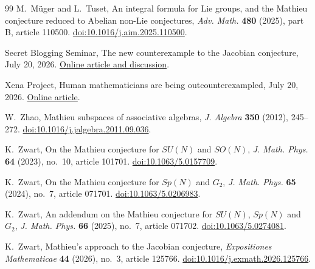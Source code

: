 \documentclass[11pt]{article}
\numberwithin{equation}{section}
\begin{document}
\begin{thebibliography}{99}
M.~M\"uger and L.~Tuset,
An integral formula for Lie groups, and the Mathieu conjecture reduced to
Abelian non-Lie conjectures,
\emph{Adv. Math.} \textbf{480} (2025), part B, article 110500.
\href{https://doi.org/10.1016/j.aim.2025.110500}{doi:10.1016/j.aim.2025.110500}.

Secret Blogging Seminar,
The new counterexample to the Jacobian conjecture,
July 20, 2026.
\href{https://sbseminar.wordpress.com/2026/07/20/the-new-counterexample-to-the-jacobian-conjecture/}{Online article and discussion}.

Xena Project,
Human mathematicians are being outcounterexampled,
July 20, 2026.
\href{https://xenaproject.wordpress.com/2026/07/20/human-mathematicians-are-being-outcounterexampled/}{Online article}.

W.~Zhao,
Mathieu subspaces of associative algebras,
\emph{J. Algebra} \textbf{350} (2012), 245--272.
\href{https://doi.org/10.1016/j.jalgebra.2011.09.036}{doi:10.1016/j.jalgebra.2011.09.036}.

K.~Zwart,
On the Mathieu conjecture for $SU(N)$ and $SO(N)$,
\emph{J. Math. Phys.} \textbf{64} (2023), no.~10, article 101701.
\href{https://doi.org/10.1063/5.0157709}{doi:10.1063/5.0157709}.

K.~Zwart,
On the Mathieu conjecture for $Sp(N)$ and $G_2$,
\emph{J. Math. Phys.} \textbf{65} (2024), no.~7, article 071701.
\href{https://doi.org/10.1063/5.0206983}{doi:10.1063/5.0206983}.

K.~Zwart,
An addendum on the Mathieu conjecture for $SU(N)$, $Sp(N)$ and $G_2$,
\emph{J. Math. Phys.} \textbf{66} (2025), no.~7, article 071702.
\href{https://doi.org/10.1063/5.0274081}{doi:10.1063/5.0274081}.

K.~Zwart,
Mathieu's approach to the Jacobian conjecture,
\emph{Expositiones Mathematicae} \textbf{44} (2026), no.~3,
article 125766.
\href{https://doi.org/10.1016/j.exmath.2026.125766}{doi:10.1016/j.exmath.2026.125766}.

\end{thebibliography}
\end{document}
